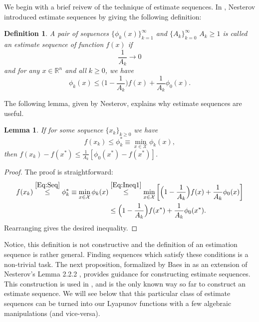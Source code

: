 \documentclass[11pt]{article}
\theoremstyle{plain}
\newtheorem{definition}{Definition}
\newtheorem{lemma}[theorem]{Lemma}
\newcommand{\R}{{\mathbb R}}
\newcommand{\X}{{\mathcal X}}
\begin{document}
We begin with a brief reivew of the technique of estimate sequences. 
In \cite{Nesterov04}, Nesterov introduced estimate sequences by giving the following definition:
\begin{definition}\cite[2.2.1]{Nesterov04} A pair of sequences $\{\phi_k(x)\}_{k=1}^\infty$ and $\{A_k\}_{k=0}^\infty$ $A_k \geq1$ is called an {\em estimate sequence} of function $f(x)$ if 
\[ \frac{1}{A_k} \rightarrow 0 \]
and for any $x \in \R^n$ and all $k \geq 0$, we have 
\begin{equation}\label{Eq:Ineq1}
\phi_k(x) \leq \Big(1 - \frac{1}{A_k}\Big)f(x) + \frac{1}{A_k}\phi_0(x).
\end{equation}
\end{definition}
\noindent The following lemma, given by Nesterov, explains why estimate sequences are useful.
%
%
\begin{lemma}\label{Lem:Nest2.2.1} \cite[2.2.1]{Nesterov04}
If for some sequence $\{x_k\}_{k\geq0}$ we have 
\begin{equation}\label{Eq:Seq}
f(x_k) \leq \phi_k^\ast \equiv \min_{x \in \X} \phi_k(x),
\end{equation}
then $f(x_k) - f(x^\ast) \leq \frac{1}{A_k} [\phi_0(x^\ast) - f(x^\ast)]$. 
\end{lemma}
%
%
\begin{proof}The proof is straightforward:
\begin{align*}
f(x_k) \overset{\eqref{Eq:Seq}}{\leq} \phi_k^\ast \equiv \min_{x \in \X} \phi_k(x) &\overset{\eqref{Eq:Ineq1}}{\leq}\min_{x \in\X}\left[\Big(1 - \frac{1}{A_k}\Big)f(x) + \frac{1}{A_k}\phi_0(x)\right]\\
&\leq \Big(1 - \frac{1}{A_k}\Big)f(x^\ast) + \frac{1}{A_k}\phi_0(x^\ast).
\end{align*}
Rearranging gives the desired inequality.
\end{proof}
%
%
Notice, this definition is not constructive and the definition of an estimation sequence is rather general. Finding sequences which satisfy these conditions is a non-trivial task. The next proposition, formalized by Baes in \cite{Baes09} as an  extension of Nesterov's Lemma 2.2.2 \cite{Nesterov04}, provides guidance for constructing estimate sequences. This construction is used in \cite{Nesterov04, Nesterov05, Nesterov08, Baes09, Nesterov15, NesterovCond15}, and is the only known way so far to construct an estimate sequence.  We will see below that this particular class of estimate sequences can be turned into our Lyapunov functions with a few algebraic manipulations (and vice-versa).
\end{document}
